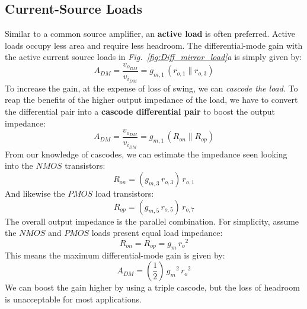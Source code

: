 \subsection{Current-Source Loads}
Similar to a common source amplifier, an \textbf{active load} is often preferred.  Active loads occupy less area and require less headroom.  The differential-mode gain with the active current source loads in \emph{Fig.~\ref{fig:Diff_mirror_load}a} is simply given by:
    \begin{equation}
        A_{DM} = \frac{v_{o_{DM}}}{v_{i_{DM}}} = g_{m,1}\,\left(r_{o,1} \parallel r_{o,3}\right)
    \end{equation}
To increase the gain, at the expense of loss of swing, we can \textit{cascode the load}.  To reap the benefits of the higher output impedance of the load, we have to convert the differential pair into a \textbf{cascode differential pair} to boost the output impedance:
    \begin{equation}
        A_{DM} = \frac{v_{o_{DM}}}{v_{i_{DM}}} = g_{m,1}\,\left(R_{on} \parallel R_{op}\right)
    \end{equation}
From our knowledge of cascodes, we can estimate the impedance seen looking into the $NMOS$ transistors:
    \begin{equation}
        R_{on} = \left(g_{m,3}\,r_{o,3}\right)\,r_{o,1}
    \end{equation}
And likewise the $PMOS$ load transistors:
    \begin{equation}
        R_{op} = \left(g_{m,5}\,r_{o,5}\right)\,r_{o,7}
    \end{equation}
The overall output impedance is the parallel combination.  For simplicity, assume the $NMOS$ and $PMOS$ loads present equal load impedance:
    \begin{equation}
        R_{on} = R_{op} = g_m\,{r_o}^2
    \end{equation}
This means the maximum differential-mode gain is given by:
    \begin{equation}
        A_{DM} = \left(\frac{1}{2}\right)\,{g_m}^2\,{r_o}^2
    \end{equation}
We can boost the gain higher by using a triple cascode, but the loss of headroom is unacceptable for most applications.
